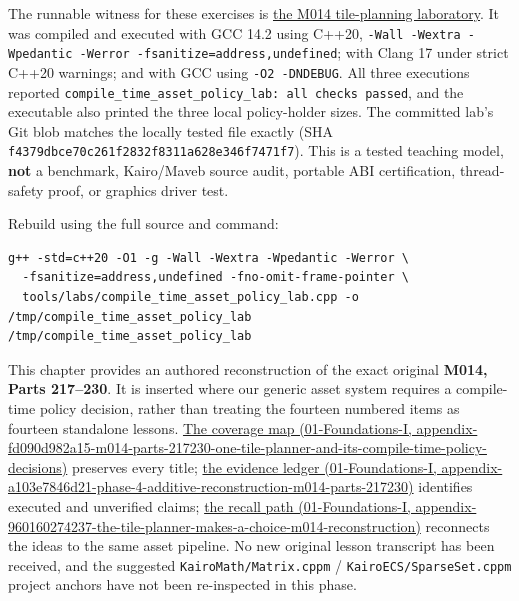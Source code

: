The runnable witness for these exercises is \hyperref[source-file-f5eb017280bb6b2ae6b1475d]{the M014 tile-planning laboratory}. It was compiled and executed with GCC 14.2 using C++20, \texttt{-Wall\ -Wextra\ -Wpedantic\ -Werror\ -fsanitize=address,undefined}; with Clang 17 under strict C++20 warnings; and with GCC using \texttt{-O2\ -DNDEBUG}. All three executions reported \texttt{compile\_time\_asset\_policy\_lab:\ all\ checks\ passed}, and the executable also printed the three local policy-holder sizes. The committed lab's Git blob matches the locally tested file exactly (SHA \texttt{f4379dbce70c261f2832f8311a628e346f7471f7}). This is a tested teaching model, \textbf{not} a benchmark, Kairo/Maveb source audit, portable ABI certification, thread-safety proof, or graphics driver test.

Rebuild using the full source and command:

\begin{verbatim}
g++ -std=c++20 -O1 -g -Wall -Wextra -Wpedantic -Werror \
  -fsanitize=address,undefined -fno-omit-frame-pointer \
  tools/labs/compile_time_asset_policy_lab.cpp -o /tmp/compile_time_asset_policy_lab
/tmp/compile_time_asset_policy_lab
\end{verbatim}

This chapter provides an authored reconstruction of the exact original \textbf{M014, Parts 217--230}. It is inserted where our generic asset system requires a compile-time policy decision, rather than treating the fourteen numbered items as fourteen standalone lessons. \href{../01-Foundations-I/main.pdf\#nameddest=appendix-fd090d982a15-m014-parts-217230-one-tile-planner-and-its-compile-time-policy-decisions}{The coverage map (01-Foundations-I, appendix-fd090d982a15-m014-parts-217230-one-tile-planner-and-its-compile-time-policy-decisions)} preserves every title; \href{../01-Foundations-I/main.pdf\#nameddest=appendix-a103e7846d21-phase-4-additive-reconstruction-m014-parts-217230}{the evidence ledger (01-Foundations-I, appendix-a103e7846d21-phase-4-additive-reconstruction-m014-parts-217230)} identifies executed and unverified claims; \href{../01-Foundations-I/main.pdf\#nameddest=appendix-960160274237-the-tile-planner-makes-a-choice-m014-reconstruction}{the recall path (01-Foundations-I, appendix-960160274237-the-tile-planner-makes-a-choice-m014-reconstruction)} reconnects the ideas to the same asset pipeline. No new original lesson transcript has been received, and the suggested \texttt{KairoMath/Matrix.cppm} / \texttt{KairoECS/SparseSet.cppm} project anchors have not been re-inspected in this phase.

